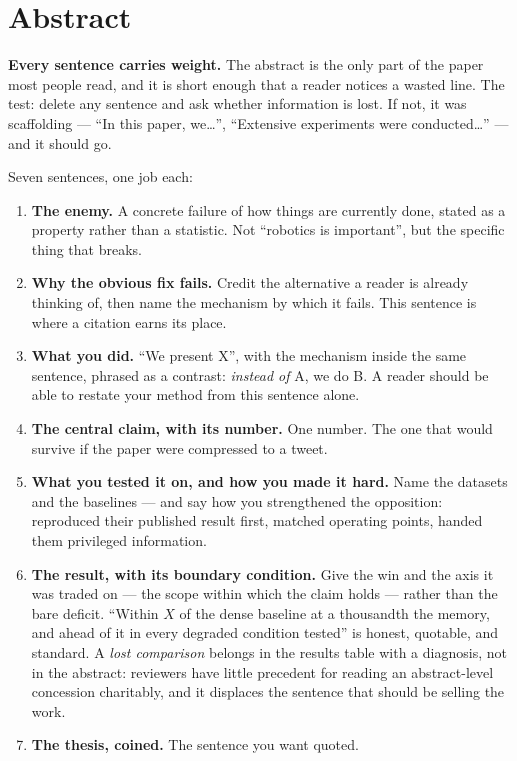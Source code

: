 \documentclass[11pt,a4paper]{article}
\begin{document}
\section{Abstract}

\textbf{Every sentence carries weight.} The abstract is the only part of the
paper most people read, and it is short enough that a reader notices a wasted
line. The test: delete any sentence and ask whether information is lost. If
not, it was scaffolding --- ``In this paper, we\ldots'', ``Extensive
experiments were conducted\ldots'' --- and it should go.

Seven sentences, one job each:

\begin{enumerate}[leftmargin=*,label=\textbf{S\arabic*.}]
  \item \textbf{The enemy.} A concrete failure of how things are currently
    done, stated as a property rather than a statistic. Not ``robotics is
    important'', but the specific thing that breaks.
  \item \textbf{Why the obvious fix fails.} Credit the alternative a reader is
    already thinking of, then name the mechanism by which it fails. This
    sentence is where a citation earns its place.
  \item \textbf{What you did.} ``We present X'', with the mechanism inside
    the same sentence, phrased as a contrast: \emph{instead of} A, we do B.
    A reader should be able to restate your method from this sentence alone.
  \item \textbf{The central claim, with its number.} One number. The one that
    would survive if the paper were compressed to a tweet.
  \item \textbf{What you tested it on, and how you made it hard.} Name the
    datasets and the baselines --- and say how you strengthened the
    opposition: reproduced their published result first, matched operating
    points, handed them privileged information.
  \item \textbf{The result, with its boundary condition.} Give the win and
    the axis it was traded on --- the scope within which the claim holds ---
    rather than the bare deficit. ``Within $X$ of the dense baseline at a
    thousandth the memory, and ahead of it in every degraded condition
    tested'' is honest, quotable, and standard. A \emph{lost comparison}
    belongs in the results table with a diagnosis, not in the abstract:
    reviewers have little precedent for reading an abstract-level concession
    charitably, and it displaces the sentence that should be selling the
    work.
  \item \textbf{The thesis, coined.} The sentence you want quoted.
\end{enumerate}
\end{document}
